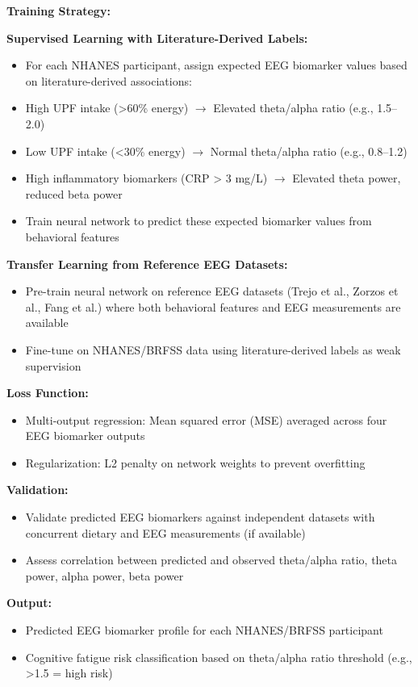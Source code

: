 \documentclass[journal,twoside,10pt]{IEEEtran}
\begin{document}
\textbf{Training Strategy:}

\textbf{Supervised Learning with Literature-Derived Labels:}
\begin{itemize}
\item For each NHANES participant, assign expected EEG biomarker values based on literature-derived associations:
\item High UPF intake (>60\% energy) $\rightarrow$ Elevated theta/alpha ratio (e.g., 1.5--2.0)
\item Low UPF intake (<30\% energy) $\rightarrow$ Normal theta/alpha ratio (e.g., 0.8--1.2)
\item High inflammatory biomarkers (CRP > 3 mg/L) $\rightarrow$ Elevated theta power, reduced beta power
\item Train neural network to predict these expected biomarker values from behavioral features
\end{itemize}

\textbf{Transfer Learning from Reference EEG Datasets:}
\begin{itemize}
\item Pre-train neural network on reference EEG datasets (Trejo et al., Zorzos et al., Fang et al.) where both behavioral features and EEG measurements are available
\item Fine-tune on NHANES/BRFSS data using literature-derived labels as weak supervision
\end{itemize}

\textbf{Loss Function:}
\begin{itemize}
\item Multi-output regression: Mean squared error (MSE) averaged across four EEG biomarker outputs
\item Regularization: L2 penalty on network weights to prevent overfitting
\end{itemize}

\textbf{Validation:}
\begin{itemize}
\item Validate predicted EEG biomarkers against independent datasets with concurrent dietary and EEG measurements (if available)
\item Assess correlation between predicted and observed theta/alpha ratio, theta power, alpha power, beta power
\end{itemize}

\textbf{Output:}
\begin{itemize}
\item Predicted EEG biomarker profile for each NHANES/BRFSS participant
\item Cognitive fatigue risk classification based on theta/alpha ratio threshold (e.g., >1.5 = high risk)
\end{itemize}
\end{document}
